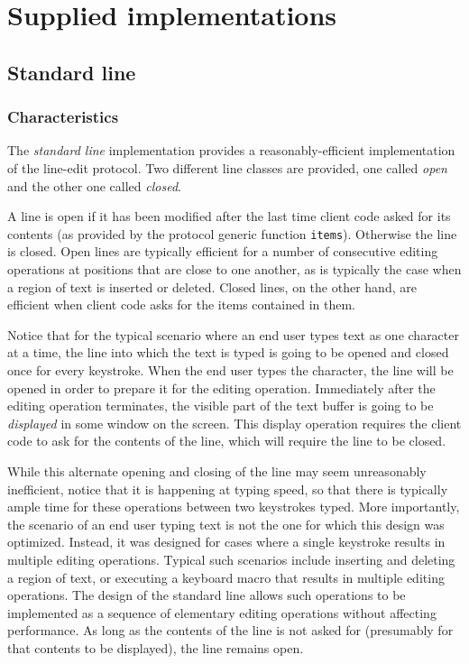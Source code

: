 \chapter{Supplied implementations}
\label{chap-supplied-implementations}

\section{Standard line}
\label{sec-implementation-standard-line}

\subsection{Characteristics}

The \emph{standard line} implementation provides a
reasonably-efficient implementation of the line-edit protocol.  Two
different line classes are provided, one called \emph{open} and the
other one called \emph{closed}.

A line is open if it has been modified after the last time client code
asked for its contents (as provided by the protocol generic function
\texttt{items}).  Otherwise the line is closed.  Open lines are
typically efficient for a number of consecutive editing operations at
positions that are close to one another, as is typically the case when
a region of text is inserted or deleted.  Closed lines, on the other
hand, are efficient when client code asks for the items contained in
them.

Notice that for the typical scenario where an end user types text as
one character at a time, the line into which the text is typed is
going to be opened and closed once for every keystroke.  When the end
user types the character, the line will be opened in order to prepare
it for the editing operation.  Immediately after the editing operation
terminates, the visible part of the text buffer is going to be
\emph{displayed} in some window on the screen.  This display operation
requires the client code to ask for the contents of the line, which
will require the line to be closed.

While this alternate opening and closing of the line may seem
unreasonably inefficient, notice that it is happening at typing speed,
so that there is typically ample time for these operations between two
keystrokes typed.  More importantly, the scenario of an end user
typing text is not the one for which this design was optimized.
Instead, it was designed for cases where a single keystroke results in
multiple editing operations.  Typical such scenarios include inserting
and deleting a region of text, or executing a keyboard macro that
results in multiple editing operations.  The design of the standard
line allows such operations to be implemented as a sequence of
elementary editing operations without affecting performance.  As long
as the contents of the line is not asked for (presumably for that
contents to be displayed), the line remains open.

